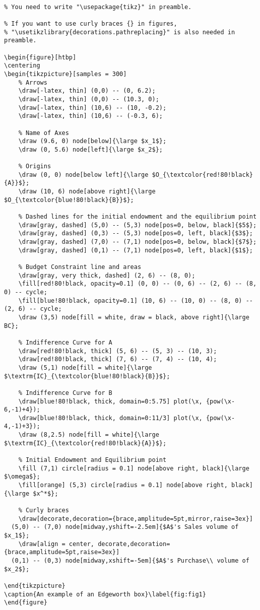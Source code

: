 \documentclass[a4paper]{article}
\begin{document}
\begin{verbatim}

% You need to write "\usepackage{tikz}" in preamble.

% If you want to use curly braces {} in figures, 
% "\usetikzlibrary{decorations.pathreplacing}" is also needed in preamble.

\begin{figure}[htbp]
\centering
\begin{tikzpicture}[samples = 300]
    % Arrows
    \draw[-latex, thin] (0,0) -- (0, 6.2);
    \draw[-latex, thin] (0,0) -- (10.3, 0);
    \draw[-latex, thin] (10,6) -- (10, -0.2);
    \draw[-latex, thin] (10,6) -- (-0.3, 6);

    % Name of Axes
    \draw (9.6, 0) node[below]{\large $x_1$};
    \draw (0, 5.6) node[left]{\large $x_2$};

    % Origins
    \draw (0, 0) node[below left]{\large $O_{\textcolor{red!80!black}{A}}$};
    \draw (10, 6) node[above right]{\large $O_{\textcolor{blue!80!black}{B}}$};

    % Dashed lines for the initial endowment and the equilibrium point
    \draw[gray, dashed] (5,0) -- (5,3) node[pos=0, below, black]{$5$};
    \draw[gray, dashed] (0,3) -- (5,3) node[pos=0, left, black]{$3$};
    \draw[gray, dashed] (7,0) -- (7,1) node[pos=0, below, black]{$7$};
    \draw[gray, dashed] (0,1) -- (7,1) node[pos=0, left, black]{$1$};

    % Budget Constraint line and areas
    \draw[gray, very thick, dashed] (2, 6) -- (8, 0);
    \fill[red!80!black, opacity=0.1] (0, 0) -- (0, 6) -- (2, 6) -- (8, 0) -- cycle;
    \fill[blue!80!black, opacity=0.1] (10, 6) -- (10, 0) -- (8, 0) -- (2, 6) -- cycle;
    \draw (3,5) node[fill = white, draw = black, above right]{\large BC};

    % Indifference Curve for A
    \draw[red!80!black, thick] (5, 6) -- (5, 3) -- (10, 3);
    \draw[red!80!black, thick] (7, 6) -- (7, 4) -- (10, 4);
    \draw (5,1) node[fill = white]{\large $\textrm{IC}_{\textcolor{blue!80!black}{B}}$};
    
    % Indifference Curve for B
    \draw[blue!80!black, thick, domain=0:5.75] plot(\x, {pow(\x-6,-1)+4});
    \draw[blue!80!black, thick, domain=0:11/3] plot(\x, {pow(\x-4,-1)+3});
    \draw (8,2.5) node[fill = white]{\large $\textrm{IC}_{\textcolor{red!80!black}{A}}$};

    % Initial Endowment and Equilibrium point
    \fill (7,1) circle[radius = 0.1] node[above right, black]{\large $\omega$};
    \fill[orange] (5,3) circle[radius = 0.1] node[above right, black]{\large $x^*$};

    % Curly braces
    \draw[decorate,decoration={brace,amplitude=5pt,mirror,raise=3ex}]
  (5,0) -- (7,0) node[midway,yshift=-2.5em]{$A$'s Sales volume of $x_1$};
    \draw[align = center, decorate,decoration={brace,amplitude=5pt,raise=3ex}]
  (0,1) -- (0,3) node[midway,xshift=-5em]{$A$'s Purchase\\ volume of $x_2$};

\end{tikzpicture}
\caption{An example of an Edgeworth box}\label{fig:fig1}
\end{figure}
\end{verbatim}
\end{document}
